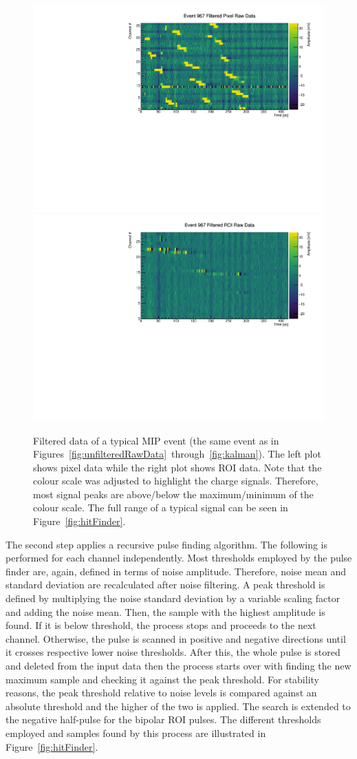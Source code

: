 \documentclass[a4paper]{article}
\begin{document}
\begin{figure}[htb]
	\centering
	\includegraphics[width=.49\textwidth]{event967_rawFilteredPixel}
	\includegraphics[width=.49\textwidth]{event967_rawFilteredROI}
	\caption{Filtered data of a typical MIP event (the same event as in Figures~\ref{fig:unfilteredRawData}~through~\ref{fig:kalman}).
		The left plot shows pixel data while the right plot shows ROI data.
		Note that the colour scale was adjusted to highlight the charge signals.
		Therefore, most signal peaks are above/below the maximum/minimum of the colour scale.
		The full range of a typical signal can be seen in Figure~\ref{fig:hitFinder}.}
	\label{fig:filteredRawData}
\end{figure}

The second step applies a recursive pulse finding algorithm.
The following is performed for each channel independently.
Most thresholds employed by the pulse finder are, again, defined in terms of noise amplitude.
Therefore, noise mean and standard deviation are recalculated after noise filtering.
A peak threshold is defined by multiplying the noise standard deviation by a variable scaling factor and adding the noise mean.
Then, the sample with the highest amplitude is found.
If it is below threshold, the process stops and proceeds to the next channel.
Otherwise, the pulse is scanned in positive and negative directions until it crosses respective lower noise thresholds.
After this, the whole pulse is stored and deleted from the input data then the process starts over with finding the new maximum sample and checking it against the peak threshold.
For stability reasons, the peak threshold relative to noise levels is compared against an absolute threshold and the higher of the two is applied.
The search is extended to the negative half-pulse for the bipolar ROI pulses.
The different thresholds employed and samples found by this process are illustrated in Figure~\ref{fig:hitFinder}.
\end{document}
